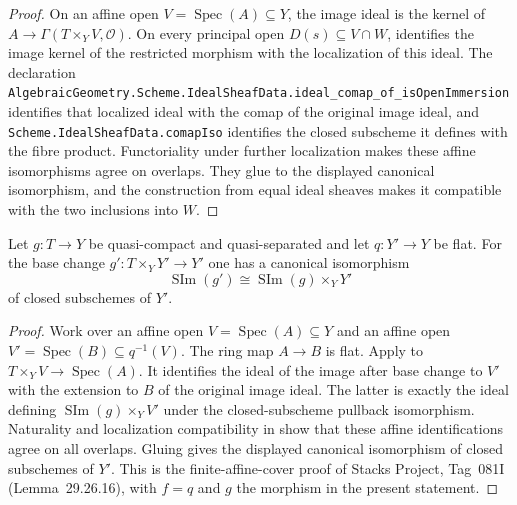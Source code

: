 \begin{proof}
  On an affine open $V=\operatorname{Spec}(A)\subseteq Y$, the image ideal is
  the kernel of
  $A\to\Gamma(T\times_YV,\mathcal O)$.  On every principal open
  $D(s)\subseteq V\cap W$,
   identifies the image
  kernel of the restricted morphism with the localization of this ideal.
  The declaration
  \texttt{AlgebraicGeometry.Scheme.IdealSheafData.ideal\_comap\_of\_isOpenImmersion}
  identifies that localized ideal with the comap of the original image ideal,
  and \texttt{Scheme.IdealSheafData.comapIso} identifies the closed
  subscheme it defines with the fibre product.  Functoriality under further
  localization makes these affine isomorphisms agree on overlaps.  They glue
  to the displayed canonical isomorphism, and the construction from equal
  ideal sheaves makes it compatible with the two inclusions into $W$.
\end{proof}

\begin{lemma}
  \label{lemma:nagata-scheme-image-flat-base-change}

  Let $g\colon T\to Y$ be quasi-compact and quasi-separated and let
  $q\colon Y'\to Y$ be flat.  For the base change
  $g'\colon T\times_YY'\to Y'$ one has a canonical isomorphism
  \[
    \operatorname{SIm}(g')
      \cong\operatorname{SIm}(g)\times_YY'
  \]
  of closed subschemes of $Y'$.
\end{lemma}

\begin{proof}
  Work over an affine open $V=\operatorname{Spec}(A)\subseteq Y$ and an
  affine open $V'=\operatorname{Spec}(B)\subseteq q^{-1}(V)$.  The ring map
  $A\to B$ is flat.  Apply
   to
  $T\times_YV\to\operatorname{Spec}(A)$.  It identifies the ideal of the
  image after base change to $V'$ with the extension to $B$ of the original
  image ideal.  The latter is exactly the ideal defining
  $\operatorname{SIm}(g)\times_YV'$ under the closed-subscheme pullback
  isomorphism.  Naturality and localization compatibility in
   show that these affine
  identifications agree on all overlaps.  Gluing gives the displayed
  canonical isomorphism of closed subschemes of $Y'$.  This is the
  finite-affine-cover proof of Stacks Project, Tag~081I
  (Lemma~29.26.16), with $f=q$ and $g$ the morphism in the present statement.
\end{proof}

